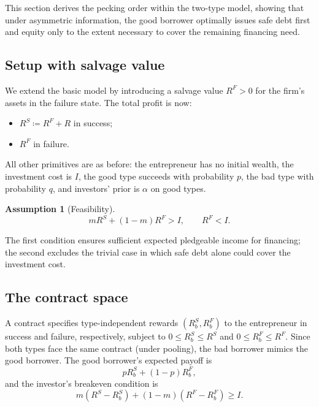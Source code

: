 \documentclass[11pt,a4paper,oneside]{book}
\def\leq{\leqslant}
\def\geq{\geqslant}
\theoremstyle{plain}
\theoremstyle{definition}
\newtheorem{assumption}[theorem]{Assumption}
\theoremstyle{remark}
\numberwithin{equation}{chapter}
\begin{document}
This section derives the pecking order within the two-type model, showing that under asymmetric information, the good borrower optimally issues safe debt first and equity only to the extent necessary to cover the remaining financing need.

\subsection{Setup with salvage value}

We extend the basic model by introducing a salvage value $R^F > 0$ for the firm's assets in the failure state.
The total profit is now:
\begin{itemize}
  \item $R^S \coloneqq R^F + R$ in success;
  \item $R^F$ in failure.
\end{itemize}
All other primitives are as before: the entrepreneur has no initial wealth, the investment cost is $I$, the good type succeeds with probability $p$, the bad type with probability $q$, and investors' prior is $\alpha$ on good types.

\begin{assumption}[Feasibility]\label{ass:pecking}
\begin{equation}\label{eq:pecking-feasibility}
  m R^S + (1 - m) R^F > I,
  \qquad R^F < I.
\end{equation}
\end{assumption}

The first condition ensures sufficient expected pledgeable income for financing; the second excludes the trivial case in which safe debt alone could cover the investment cost.

\subsection{The contract space}

A contract specifies type-independent rewards $(R_b^S, R_b^F)$ to the entrepreneur in success and failure, respectively, subject to $0 \leq R_b^S \leq R^S$ and $0 \leq R_b^F \leq R^F$.
Since both types face the same contract (under pooling), the bad borrower mimics the good borrower.
The good borrower's expected payoff is
\begin{equation}\label{eq:pecking-good-payoff}
  p R_b^S + (1 - p) R_b^F,
\end{equation}
and the investor's breakeven condition is
\begin{equation}\label{eq:pecking-breakeven}
  m(R^S - R_b^S) + (1 - m)(R^F - R_b^F) \geq I.
\end{equation}
\end{document}
